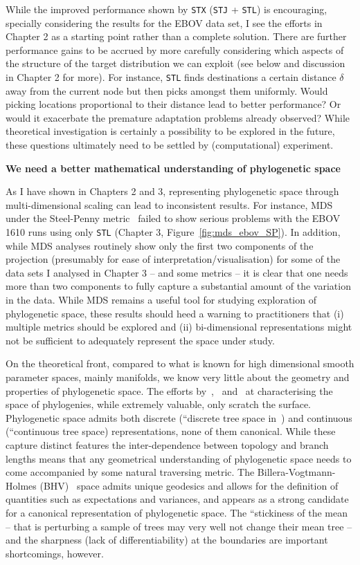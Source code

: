 While the improved performance shown by \verb|STX| (\verb|STJ| + \verb|STL|) is encouraging, specially considering the results for the EBOV data set, I see the efforts in Chapter 2 as a starting point rather than a complete solution.
There are further performance gains to be accrued by more carefully considering which aspects of the structure of the target distribution we can exploit (see below and discussion in Chapter 2 for more).
For instance, \verb|STL| finds destinations a certain distance $\delta$ away from the current node but then picks amongst them uniformly. 
Would picking locations proportional to their distance lead to better performance? Or would it exacerbate the premature adaptation problems already observed?
While theoretical investigation is certainly a possibility to be explored in the future, these questions ultimately need to be settled by (computational) experiment.


\textbf{We need a better mathematical understanding of phylogenetic space} 

As I have shown in Chapters 2 and 3, representing phylogenetic space through multi-dimensional scaling can lead to inconsistent results.
For instance, MDS under the Steel-Penny metric~\citep{Steel1993} failed to show serious problems with the EBOV 1610 runs using only \verb|STL| (Chapter 3, Figure~\ref{fig:mds_ebov_SP}).
In addition, while MDS analyses routinely show only the first two components of the projection (presumably for ease of interpretation/visualisation) for some of the data sets I analysed in Chapter 3 -- and some metrics -- it is clear that one needs more than two components to fully capture a substantial amount of the variation in the data.
While MDS remains a useful tool for studying exploration of phylogenetic space, these results should heed a warning to practitioners that (i) multiple metrics should be explored and (ii) bi-dimensional representations might not be sufficient to  adequately represent the space under study.

On the theoretical front, compared to what is known for high dimensional smooth parameter spaces, mainly manifolds, we know very little about the geometry and properties of phylogenetic space.
The efforts by~\cite{Billera2001},~\cite{Gavryushkin2016} and~\cite{Whidden2017} at characterising the space of phylogenies, while extremely valuable, only scratch the surface.
Phylogenetic space admits both discrete (``discrete tree space in~\cite{StJohn2017}) and continuous (``continuous tree space) representations, none of them canonical.
While these capture distinct features the inter-dependence between topology and branch lengths means that any geometrical understanding of phylogenetic space needs to come accompanied by some natural traversing metric.
The Billera-Vogtmann-Holmes (BHV)~\citep{Billera2001} space admits unique geodesics and allows for the definition of quantities such as expectations and variances, and appears as a strong candidate for a canonical representation of phylogenetic space.
The ``stickiness  of the mean -- that is perturbing a sample of trees may very well not change their mean tree -- and the sharpness (lack of differentiability) at the boundaries are important shortcomings, however. 

